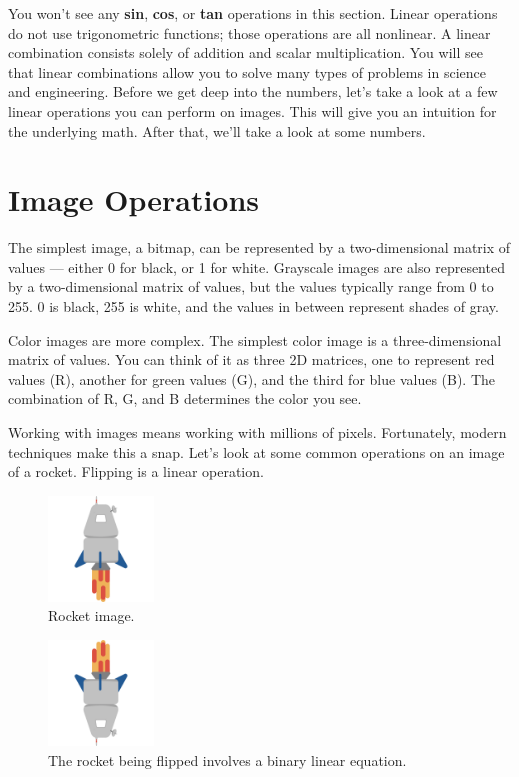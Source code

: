 You won't see any \textbf{sin}, \textbf{cos}, or \textbf{tan} operations in 
this section. Linear operations do not use trigonometric functions; those 
operations are all nonlinear. A linear combination consists solely of addition and 
scalar multiplication. You will see that linear combinations allow you to 
solve many types of problems in science and engineering. Before we get deep 
into the numbers, let's take a look at a few linear operations you can perform 
on images. This will give you an intuition for the underlying math. After 
that, we'll take a look at some numbers.

\section{Image Operations}
The simplest image, a bitmap, can be represented by a two-dimensional matrix 
of values --- either 0 for black, or 1 for white. Grayscale images are also 
represented by a two-dimensional matrix of values, but the values typically 
range from 0 to 255. 0 is black, 255 is white, and the values in between 
represent shades of gray. 

Color images are more complex. The simplest color image is a three-dimensional 
matrix of values. You can think of it as three 2D matrices, one to represent 
red values (R), another for green values (G), and the third for blue values 
(B). The combination of R, G, and B determines the color you see.

Working with images means working with millions of pixels. Fortunately, 
modern techniques make this a snap. Let's look at some common operations on an 
image of a rocket.
Flipping is a linear operation.
\begin{figure}[htbp]
    \centering
    \includegraphics[width=0.25\textwidth]{flying-rocket.png}
    \caption{Rocket image.}
    \label{fig:flying-rocket}
\end{figure}

\begin{figure}[htbp]
    \centering
    \includegraphics[width=0.25\textwidth]{rocket-flipped.png}
    \caption{The rocket being flipped involves a binary linear equation.}
    \label{fig:rocket_flipped}
\end{figure}

